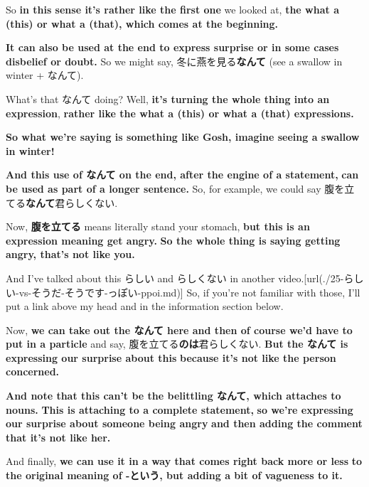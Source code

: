 So {\bf in this sense it's rather like the first one} we looked at, {\bf the what a (this) or what a (that), which comes at the beginning.}

\thinrule

{\bf It can also be used at the end to express surprise or in some cases disbelief or doubt.} So we might say, 冬に燕を見る{\bf なんて} (see a swallow in winter + なんて).

What's that なんて doing? Well, {\bf it's turning the whole thing into an expression}, {\bf rather like the what a (this) or what a (that) expressions.}

{\bf So what we're saying is something like Gosh, imagine seeing a swallow in winter!}

\thinrule

{\bf And this use of なんて on the end, after the engine of a statement,} {\bf can be used as part of a longer sentence.} So, for example, we could say 腹を立てる{\bf なんて}君らしくない.

Now, {\bf 腹を立てる} means literally stand your stomach, {\bf but this is an expression meaning get angry.} {\bf So the whole thing is saying getting angry, that's not like you.}

And I've talked about this らしい and らしくない in another video.\goto{{[}25{]}}[url(./25-らしい-vs-そうだ-そうです-っぽい-ppoi.md)] So, if you're not familiar with those, I'll put a link above my head and in the information section below.

\thinrule

Now, {\bf we can take out the なんて here and then of course we'd have to put in a particle} and say, 腹を立てる{\bf のは}君らしくない. {\bf But the なんて is expressing our surprise about this} {\bf because it's not like the person concerned.}

\thinrule

{\bf And note that this can't be the belittling なんて, which attaches to nouns.} {\bf This is attaching to a complete statement,} {\bf so we're expressing our surprise about someone being angry} {\bf and then adding the comment that it's not like her.}

\stopsectionlevel

\startsectionlevel[title={なんて as this vague という},reference={なんて-as-this-vague-という}]

And finally, {\bf we can use it in a way that comes right back more or less} {\bf to the original meaning of -という, but adding a bit of vagueness to it.}

